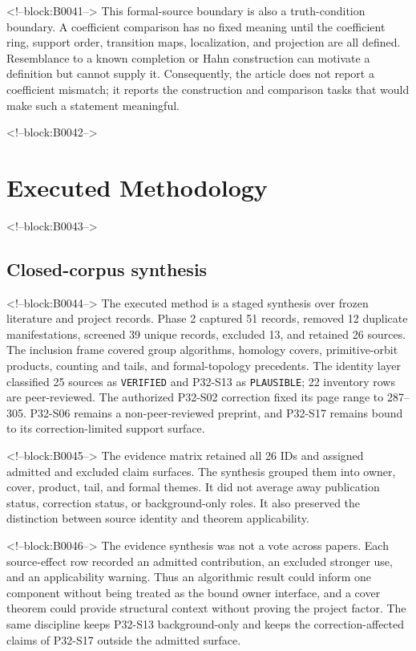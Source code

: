 \documentclass[11pt]{article}
\begin{document}
<!--block:B0041-->
This formal-source boundary is also a truth-condition boundary. A
coefficient comparison has no fixed meaning until the coefficient ring,
support order, transition maps, localization, and projection are all
defined. Resemblance to a known completion or Hahn construction can
motivate a definition but cannot supply it. Consequently, the article
does not report a coefficient mismatch; it reports the construction and
comparison tasks that would make such a statement meaningful.

<!--block:B0042-->
\hypertarget{3-executed-methodology}{%
\section{Executed Methodology}\label{3-executed-methodology}}

<!--block:B0043-->
\hypertarget{31-closed-corpus-synthesis}{%
\subsection{Closed-corpus
synthesis}\label{31-closed-corpus-synthesis}}

<!--block:B0044-->
The executed method is a staged synthesis over frozen literature and
project records. Phase 2 captured 51 records, removed 12 duplicate
manifestations, screened 39 unique records, excluded 13, and retained 26
sources. The inclusion frame covered group algorithms, homology covers,
primitive-orbit products, counting and tails, and formal-topology
precedents. The identity layer classified 25 sources as
\texttt{VERIFIED} and P32-S13 as \texttt{PLAUSIBLE}; 22 inventory rows
are peer-reviewed. The authorized P32-S02 correction fixed its page
range to 287--305. P32-S06 remains a non-peer-reviewed preprint, and
P32-S17 remains bound to its correction-limited support surface.

<!--block:B0045-->
The evidence matrix retained all 26 IDs and assigned admitted and
excluded claim surfaces. The synthesis grouped them into owner, cover,
product, tail, and formal themes. It did not average away publication
status, correction status, or background-only roles. It also preserved
the distinction between source identity and theorem applicability.

<!--block:B0046-->
The evidence synthesis was not a vote across papers. Each source-effect
row recorded an admitted contribution, an excluded stronger use, and an
applicability warning. Thus an algorithmic result could inform one
component without being treated as the bound owner interface, and a
cover theorem could provide structural context without proving the
project factor. The same discipline keeps P32-S13 background-only and
keeps the correction-affected claims of P32-S17 outside the admitted
surface.
\end{document}
